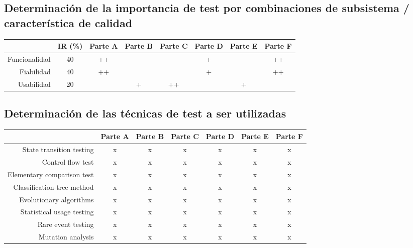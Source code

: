\documentclass[
11pt,
spanish,
singlespacing,
parskip, 
headsepline,
a4paper
]{article}
\begin{document}
\subsection{Determinación de la importancia de test por combinaciones de subsistema / característica de calidad}

\begin{table}[H]
\centering
\begin{tabular}{r|ccccccc}
               & IR (\%) & Parte A & Parte B & Parte C & Parte D & Parte E & Parte F \\ \hline
Funcionalidad  & 40      & ++      &         &         & +       &         & ++      \\
Fiabilidad     & 40      & ++      &         &         & +       &         & ++      \\
Usabilidad     & 20      &         & +       & ++      &         & +       &         \\
\end{tabular}
\end{table}

\subsection{Determinación de las técnicas de test a ser utilizadas}

\begin{table}[H]
\centering
\begin{tabular}{r|cccccc}
                           & Parte A & Parte B & Parte C & Parte D & Parte E & Parte F \\ \hline
State transition testing   & x       & x       & x       & x       & x       & x       \\
Control flow test          & x       & x       & x       & x       & x       & x       \\
Elementary comparison test & x       & x       & x       & x       & x       & x       \\
Classification-tree method & x       & x       & x       & x       & x       & x       \\
Evolutionary algorithms    & x       & x       & x       & x       & x       & x       \\
Statistical usage testing  & x       & x       & x       & x       & x       & x       \\
Rare event testing         & x       & x       & x       & x       & x       & x       \\
Mutation analysis          & x       & x       & x       & x       & x       & x       \\

\end{tabular}
\end{table}
\end{document}
